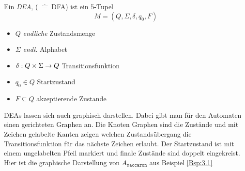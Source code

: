 \begin{Def}
	Ein \emph{\acf{DEA}}, ( $\hat=$ \acl{DFA}) ist ein 5-Tupel
	\[ M= (Q,\Sigma,\delta,q_0,F) \]
	\begin{itemize}
		\item $Q$ \emph{endliche} Zustandsmenge
		\item $\Sigma$ \emph{endl.} Alphabet
		\item $\delta:Q\x\Sigma\->Q$ Transitionsfunktion
		\item $q_0\in Q$ Startzustand
		\item $F\subseteq Q$ akzeptierende Zustande
	\end{itemize}
\end{Def}

DEAs lassen sich auch graphisch darstellen.
Dabei gibt man für den Automaten einen gerichteten Graphen an.
Die Knoten Graphen sind die Zustände und mit Zeichen gelabelte Kanten zeigen welchen Zustandsübergang die Transitionsfunktion für das nächste Zeichen erlaubt.
Der Startzustand ist mit einem ungelabelten Pfeil markiert und finale Zustände sind doppelt eingekreist.
Hier ist die graphische Darstellung von $A_{\mathtt{Maccaron}}$ aus Beispiel \ref{Bsp:3.1}

\begin{center}
\end{center}

